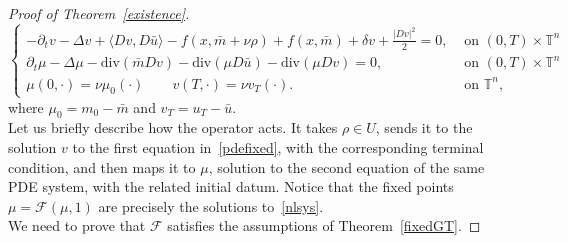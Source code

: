 \documentclass[10pt,a4paper,nouppercase,nowrite]{article}
\numberwithin{equation}{section}
\newcommand{\T}{\mathbb{T}}
\theoremstyle{definition}
\begin{document}
\begin{proof}[Proof of Theorem~\ref{existence}]
\begin{equation}
\begin{cases}
					-\partial_t v - \Delta v + \langle Dv,D\bar{u} \rangle - f(x,\bar{m}+ \nu \rho) + f(x,\bar{m}) + \delta v + \frac{|Dv|^2}{2} = 0,& \text{ on } (0,T) \times \T^n \\
					\partial_t \mu - \Delta \mu - \text{div}(\bar{m}Dv) - \text{div}(\mu D\bar{u}) - \text{div}(\mu Dv)=0,& \text{ on } (0,T) \times \T^n \\
					\mu(0,\cdot)=\nu \mu_0(\cdot) \qquad v(T,\cdot)=\nu v_T(\cdot).& \text{ on } \T^n,
				\end{cases}
				\label{pdefixed}
			\end{equation}
		where $\mu_0=m_0-\bar m$ and $v_T=u_T-\bar u$. \\
		Let us briefly describe how the operator acts. It takes $\rho \in U$, sends it to the solution $v$ to the first equation in~\eqref{pdefixed}, with the corresponding terminal condition, and then maps it to $\mu$, solution to the second equation of the same PDE system, with the related initial datum. Notice that the fixed points $\mu=\mathcal{F}(\mu,1)$ are precisely the solutions to~\eqref{nlsys}. \\
			We need to prove that $\mathcal{F}$ satisfies the assumptions of Theorem~\ref{fixedGT}.
			\medskip
			

\end{proof}
\end{document}
